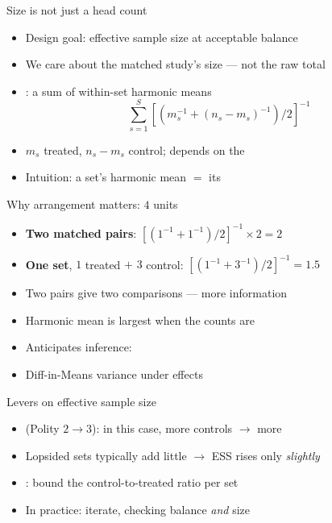\documentclass[table, xcolor = {dvipsnames}, 9pt]{beamer}
\theoremstyle{plain}
\newcommand{\mh}[1]{{\color{magenta}{#1}}}
\begin{document}
\begin{frame}[t]{Size is not just a head count}
\vfill
\begin{itemize} \vfill
\item Design goal: \mh{maximize} effective sample size at acceptable balance \vfill
\item We care about the matched study's size --- not the raw total \vfill
\item \mh{Effective sample size}: a sum of within-set harmonic means \vfill
\begin{equation*}
\sum_{s=1}^S \left[\left(m_s^{-1} + (n_s - m_s)^{-1}\right)/2\right]^{-1}
\end{equation*} \vfill
\item $m_s$ treated, $n_s - m_s$ control; depends on the \mh{arrangement} \vfill
\item Intuition: a set's harmonic mean $=$ its \mh{equivalent number of matched pairs} \vfill
\end{itemize} \vfill
\end{frame}
\begin{frame}[t]{Why arrangement matters: $4$ units}
\vfill
\begin{itemize} \vfill
\item \textbf{Two matched pairs}: $\left[(1^{-1}+1^{-1})/2\right]^{-1}\!\times 2 = 2$ \vfill
\item \textbf{One set}, $1$ treated $+$ $3$ control: $\left[(1^{-1}+3^{-1})/2\right]^{-1} = 1.5$ \vfill
\item Two pairs give two comparisons --- more information \vfill
\item Harmonic mean is largest when the counts are \mh{equal} \vfill
\item Anticipates inference: \vfill 
\item[] \mh{Minimizes} Diff-in-Means variance under \mh{constant} effects \\ \citep{hansenbowers2008} \vfill
\end{itemize} \vfill
\end{frame}
\begin{frame}[t]{Levers on effective sample size}
\vfill
\begin{itemize} \vfill
\item \mh{Relax calipers} (Polity $2 \to 3$): in this case, more controls $\to$ more \mh{lopsided}  \vfill
\item Lopsided sets typically add little $\to$ ESS rises only \emph{slightly} \vfill
\item \mh{Ratio constraints}: bound the control-to-treated ratio per set \vfill
\item In practice: iterate, checking balance \emph{and} size \citep{hansensales2015} \vfill
\end{itemize} \vfill
\end{frame}
\end{document}
